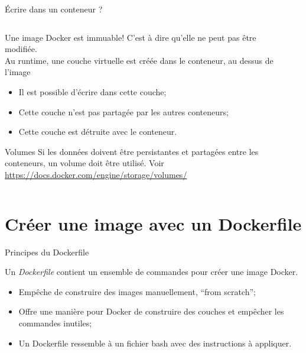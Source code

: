 \documentclass[aspectratio=169,10pt]{beamer}
\begin{document}
\begin{frame}{Écrire dans un conteneur ?}

\begin{columns}[T,onlytextwidth]
    \begin{column}{.5\linewidth}
    Une image Docker est \alert{immuable}! C'est à dire qu'elle ne peut pas être modifiée.\\
    Au runtime, une couche virtuelle est créée dans le conteneur, au dessus de l'image
    \begin{itemize}
        \item Il est possible d'écrire dans cette couche;
        \item Cette couche n'est pas partagée par les autres conteneurs;
        \item Cette couche est détruite avec le conteneur.
    \end{itemize}
    
    \begin{alertblock}{Volumes}
        Si les données doivent être \alert{persistantes et partagées} entre les conteneurs, un \alert{volume} doit être utilisé. Voir \url{https://docs.docker.com/engine/storage/volumes/}
    \end{alertblock}
        
    \end{column}
    \begin{column}{.5\linewidth}
    \begin{center}
        
    \end{center}
    \end{column}
\end{columns}

\end{frame}


\section{Créer une image avec un Dockerfile}


\begin{frame}{Principes du Dockerfile}

Un \emph{Dockerfile} contient un ensemble de commandes pour créer une image Docker.
\begin{itemize}
    \item Empêche de construire des images manuellement, ``from scratch'';
    \item Offre une manière pour Docker de construire des couches et empêcher les commandes inutiles;
    \item Un Dockerfile ressemble à un fichier bash avec des instructions à appliquer.
\end{itemize}

\end{frame}
\end{document}
